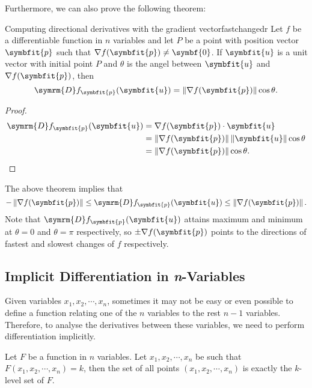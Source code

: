 \documentclass[math]{amznotes}
\theoremstyle{remark}
\begin{document}
Furthermore, we can also prove the following theorem:
\begin{thmbox}{Computing directional derivatives with the gradient vector}{fastchangedr}
    Let $f$ be a differentiable function in $n$ variables and let $P$ be a point with position vector $\symbfit{p}$ such that $\nabla f(\symbfit{p}) \neq \symbf{0}$. If $\symbfit{u}$ is a unit vector with initial point $P$ and $\theta$ is the angel between $\symbfit{u}$ and $\nabla f(\symbfit{p})$, then
    \begin{equation*}
        \symrm{D}f_{\symbfit{p}}(\symbfit{u}) = \left\lVert\nabla f(\symbfit{p})\right\rVert\cos{\theta}.
    \end{equation*}
    \tcblower
    \begin{proof}
        \begin{align*}
            \symrm{D}f_{\symbfit{p}}(\symbfit{u}) & = \nabla f(\symbfit{p}) \cdot \symbfit{u}                                                        \\
                                                  & = \left\lVert\nabla f(\symbfit{p})\right\rVert \left\lVert \symbfit{u} \right\rVert \cos{\theta} \\
                                                  & = \left\lVert\nabla f(\symbfit{p})\right\rVert\cos{\theta}.
        \end{align*}
    \end{proof}
\end{thmbox}
The above theorem implies that
\begin{displaymath}
    -\left\lVert\nabla f(\symbfit{p})\right\rVert \leq \symrm{D}f_{\symbfit{p}}(\symbfit{u}) \leq \left\lVert\nabla f(\symbfit{p})\right\rVert.
\end{displaymath}
Note that $\symrm{D}f_{\symbfit{p}}(\symbfit{u})$ attains maximum and minimum at $\theta = 0$ and $\theta = \pi$ respectively, so $\pm\nabla f(\symbfit{p})$ points to the directions of fastest and slowest changes of $f$ respectively.
\subsection{Implicit Differentiation in \textit{n}-Variables}
Given variables $x_1, x_2, \cdots, x_n$, sometimes it may not be easy or even possible to define a function relating one of the $n$ variables to the rest $n - 1$ variables. Therefore, to analyse the derivatives between these variables, we need to perform differentiation implicitly.

Let $F$ be a function in $n$ variables. Let $x_1, x_2, \cdots, x_n$ be such that $F(x_1, x_2, \cdots, x_n) = k$, then the set of all points $(x_1, x_2, \cdots, x_n)$ is exactly the $k$-level set of $F$.
\end{document}
